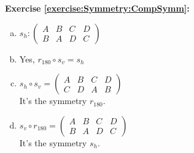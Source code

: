 \noindent\textbf{Exercise \ref{exercise:Symmetry:CompSymm}:}
\begin{enumerate}[(a)]
\item
$s_h: \begin{pmatrix}
A & B & C & D\\
B & A & D & C
\end{pmatrix}$

\item
Yes, $r_{180}\circ s_v=s_h$

\item
$s_h\circ s_v=\begin{pmatrix}
A & B & C & D\\
C & D & A & B
\end{pmatrix}$\\
It's the symmetry $r_{180}$.

\item
$s_v\circ r_{180}=\begin{pmatrix}
A & B & C & D\\
B & A & D & C
\end{pmatrix}$\\
It's the symmetry $s_h$.
\end{enumerate}

